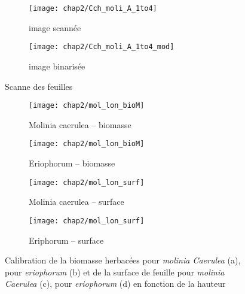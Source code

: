 \begin{figure}
	\centering
	\begin{subfigure}[t]{0.5\textwidth}
		\centering
		\texttt{[image: chap2/Cch\_moli\_A\_1to4]}
		\caption{image scannée}
	\end{subfigure}%
	\begin{subfigure}[t]{0.5\textwidth}
		\centering
		\texttt{[image: chap2/Cch\_moli\_A\_1to4\_mod]}
		\caption{image binarisée}
	\end{subfigure}
\caption{Scanne des feuilles}
\label{fig:scan_mol}
\end{figure}


\begin{figure}
	\centering
	\begin{subfigure}[t]{0.5\textwidth}
		\centering
		\texttt{[image: chap2/mol\_lon\_bioM]}
		\caption{Molinia caerulea -- biomasse}
	\end{subfigure}%
	\begin{subfigure}[t]{0.5\textwidth}
		\centering
		\texttt{[image: chap2/mol\_lon\_bioM]}
		\caption{Eriophorum -- biomasse}
	\end{subfigure}
	
	
	\begin{subfigure}[t]{0.5\textwidth}
		\centering
		\texttt{[image: chap2/mol\_lon\_surf]}
		\caption{Molinia caerulea -- surface}
	\end{subfigure}%
	\begin{subfigure}[t]{0.5\textwidth}
		\centering
		\texttt{[image: chap2/mol\_lon\_surf]}
		\caption{Eriphorum -- surface}
	\end{subfigure}
\caption{Calibration de la biomasse herbacées pour \textit{molinia Caerulea} (a), pour \textit{eriophorum} (b) et de la surface de feuille pour \textit{molinia Caerulea} (c), pour \textit{eriophorum} (d) en fonction de la hauteur}
\label{fig:cal_herb}
\end{figure}


